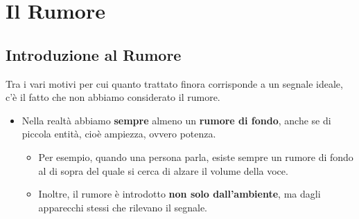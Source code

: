 \documentclass[openany,a4paper,12pt]{book}
\begin{document}
\begin{figure}[H]
\end{figure}


\section{Il Rumore}

\subsection*{Introduzione al Rumore}

Tra i vari motivi per cui quanto trattato finora corrisponde a un segnale ideale, c'è il fatto che non abbiamo considerato il rumore.

\begin{itemize}[label=\textcolor{PoliBlue}{\textbullet}]
    \item Nella realtà abbiamo \textbf{sempre} almeno un \textbf{rumore di fondo}, anche se di piccola entità, cioè ampiezza, ovvero potenza.
    \begin{itemize}[label=$\circ$]
        \item Per esempio, quando una persona parla, esiste sempre un rumore di fondo al di sopra del quale si cerca di alzare il volume della voce.
        \item Inoltre, il rumore è introdotto \textbf{non solo dall'ambiente}, ma dagli apparecchi stessi che rilevano il segnale.
    \end{itemize}
\end{itemize}
\end{document}
